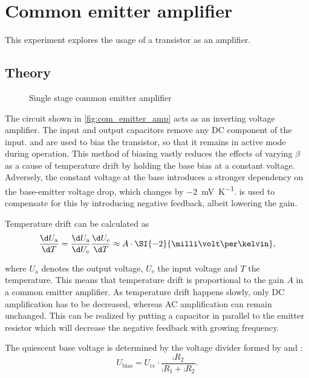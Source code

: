 \chapter{Common emitter amplifier}
This experiment explores the usage of a transistor as an amplifier.

\section{Theory}\label{sec:theory}
\begin{figure}[tbp]
	\centering
	\caption[Single Stage Common Emitter Amplifier]{Single stage common emitter amplifier}
	\label{fig:com_emitter_amp}
\end{figure}
The circuit shown in \autoref{fig:com_emitter_amp} acts as an inverting voltage amplifier.
The input and output capacitors remove any DC component of the input.
 and  are used to bias the transistor, so that it remains in active mode during operation.
This method of biasing vastly reduces the effects of varying $\beta$ as a cause of temperature drift by holding the base bias at a constant voltage.
Adversely, the constant voltage at the base introduces a stronger dependency on the base-emitter voltage drop, which changes by \SI{-2}{\milli\volt\per\kelvin}.
 is used to compensate for this by introducing negative feedback, albeit lowering the gain.

Temperature drift can be calculated as
\begin{equation}
	\frac{\d U_\text{a}}{\d T}=\frac{\d U_\text{a}}{\d U_\text{e}}\frac{\d U_\text{e}}{\d T}\approx A\cdot\SI{-2}{\milli\volt\per\kelvin},
\end{equation}

where $U_\text{a}$ denotes the output voltage, $U_\text{e}$ the input voltage and $T$ the temperature.
This means that temperature drift is proportional to the gain $A$ in a common emitter amplifier.
As temperature drift happens slowly, only DC amplification has to be decreased, whereas AC amplification can remain unchanged.
This can be realized by putting a capacitor  in parallel to the emitter resistor  which will decrease the negative feedback with growing frequency.

The quiescent base voltage is determined by the voltage divider formed by  and :
\begin{equation}\label{eq:bias_volt}
	U_\text{bias}=U_\text{cc}\cdot\frac{\comp{R_2}}{\comp{R_1}+\comp{R_2}}.
\end{equation}

